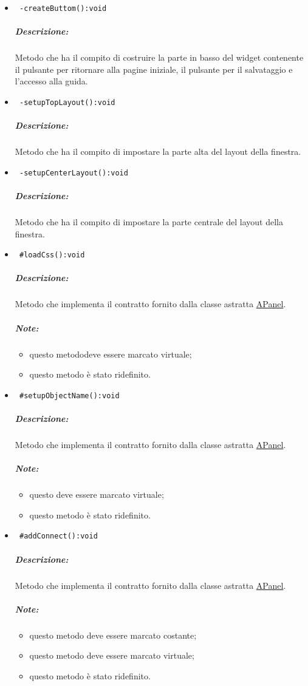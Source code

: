 \begin{itemize}
\item\color{blue}\verb! -createButtom():void!
\color{black} 
\subparagraph{Descrizione:}Metodo che ha il compito di costruire la parte in basso del widget contenente il pulsante per ritornare alla pagine iniziale, il pulsante per il salvataggio e l'accesso alla guida.
 
\item\color{blue}\verb! -setupTopLayout():void!
\color{black} 
\subparagraph{Descrizione:}Metodo che ha il compito di impostare la parte alta del layout della finestra.
   
\item\color{blue}\verb! -setupCenterLayout():void!
\color{black} 
\subparagraph{Descrizione:}Metodo che ha il compito di impostare la parte centrale del layout della finestra.
  
\item\color{blue}\verb! #loadCss():void!
\color{black}
\subparagraph{Descrizione:} Metodo che implementa il contratto fornito dalla classe astratta \hyperref[speAPanel]{APanel}.
 \subparagraph{Note:}
 \begin{itemize}
  \item questo metododeve essere marcato virtuale;
 \item questo metodo è stato ridefinito.
 \end{itemize}
  
\item\color{blue}\verb! #setupObjectName():void!
\color{black}
\subparagraph{Descrizione:}Metodo che implementa il contratto fornito dalla classe astratta \hyperref[speAPanel]{APanel}.
 \subparagraph{Note:}
 \begin{itemize}
  \item questo deve essere marcato virtuale;
 \item questo metodo è stato ridefinito.
 \end{itemize}
  
\item\color{blue}\verb! #addConnect():void!
\color{black}
\subparagraph{Descrizione:}Metodo che implementa il contratto fornito dalla classe astratta \hyperref[speAPanel]{APanel}.
 \subparagraph{Note:}
 \begin{itemize}
 \item questo metodo deve essere marcato costante;
 \item questo metodo deve essere marcato virtuale;
 \item questo metodo è stato ridefinito.
 \end{itemize}
  

\end{itemize}
